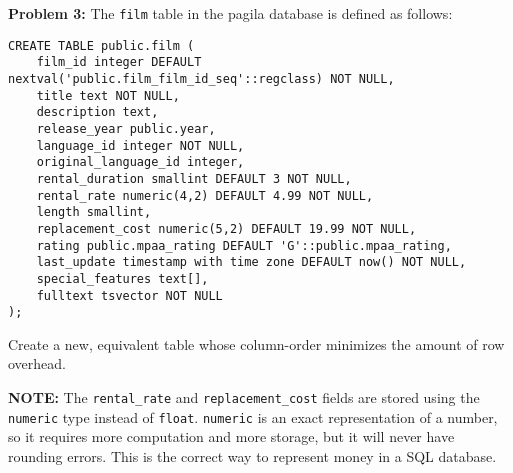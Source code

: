 \documentclass[10pt]{article}
\theoremstyle{definition}
\begin{document}
\newpage
\noindent
\textbf{Problem 3:}
The \lstinline{film} table in the pagila database is defined as follows:
\begin{lstlisting}
CREATE TABLE public.film (
    film_id integer DEFAULT nextval('public.film_film_id_seq'::regclass) NOT NULL,
    title text NOT NULL,
    description text,
    release_year public.year,
    language_id integer NOT NULL,
    original_language_id integer,
    rental_duration smallint DEFAULT 3 NOT NULL,
    rental_rate numeric(4,2) DEFAULT 4.99 NOT NULL,
    length smallint,
    replacement_cost numeric(5,2) DEFAULT 19.99 NOT NULL,
    rating public.mpaa_rating DEFAULT 'G'::public.mpaa_rating,
    last_update timestamp with time zone DEFAULT now() NOT NULL,
    special_features text[],
    fulltext tsvector NOT NULL
);
\end{lstlisting}
Create a new, equivalent table whose column-order minimizes the amount of row overhead.

\vspace{5in}
\noindent
\textbf{NOTE:}
The \lstinline{rental_rate} and \lstinline{replacement_cost} fields are stored using the \lstinline{numeric} type instead of \lstinline{float}.
\lstinline{numeric} is an exact representation of a number, so it requires more computation and more storage, but it will never have rounding errors.
This is the correct way to represent money in a SQL database.
\end{document}
